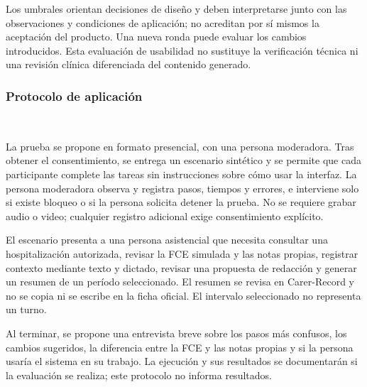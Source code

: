 Los umbrales orientan decisiones de diseño y deben interpretarse junto con las observaciones y condiciones de aplicación; no acreditan por sí mismos la aceptación del producto. Una nueva ronda puede evaluar los cambios introducidos. Esta evaluación de usabilidad no sustituye la verificación técnica ni una revisión clínica diferenciada del contenido generado.

\subsubsection*{Protocolo de aplicación} ~

La prueba se propone en formato presencial, con una persona moderadora. Tras obtener el consentimiento, se entrega un escenario sintético y se permite que cada participante complete las tareas sin instrucciones sobre cómo usar la interfaz. La persona moderadora observa y registra pasos, tiempos y errores, e interviene solo si existe bloqueo o si la persona solicita detener la prueba. No se requiere grabar audio o video; cualquier registro adicional exige consentimiento explícito.

El escenario presenta a una persona asistencial que necesita consultar una hospitalización autorizada, revisar la FCE simulada y las notas propias, registrar contexto mediante texto y dictado, revisar una propuesta de redacción y generar un resumen de un período seleccionado. El resumen se revisa en Carer-Record y no se copia ni se escribe en la ficha oficial. El intervalo seleccionado no representa un turno.

Al terminar, se propone una entrevista breve sobre los pasos más confusos, los cambios sugeridos, la diferencia entre la FCE y las notas propias y si la persona usaría el sistema en su trabajo. La ejecución y sus resultados se documentarán si la evaluación se realiza; este protocolo no informa resultados.
